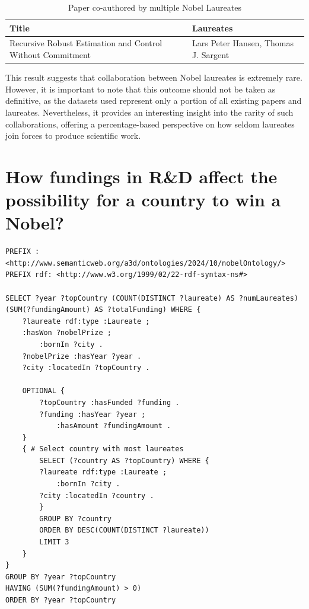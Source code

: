 \documentclass{article}
\begin{document}
\begin{table}[H]
	\caption{Paper co-authored by multiple Nobel Laureates}
	\centering
	\begin{tabular}{|l|l|}
		\hline
		\textbf{Title}                                             & \textbf{Laureates}                   \\ \hline
		Recursive Robust Estimation and Control Without Commitment & Lars Peter Hansen, Thomas J. Sargent \\ \hline
	\end{tabular}
	\label{tab:laureates_collaboration}
\end{table}

This result suggests that collaboration between Nobel laureates is extremely rare. However, it is important to
note that this outcome should not be taken as definitive, as the datasets used represent only a portion of all
existing papers and laureates. Nevertheless, it provides an interesting insight into the rarity of such
collaborations, offering a percentage-based perspective on how seldom laureates join forces to produce scientific
work.

\section{How fundings in R\&D affect the possibility for a country to win a Nobel?}

\begin{lstlisting}
PREFIX : <http://www.semanticweb.org/a3d/ontologies/2024/10/nobelOntology/>
PREFIX rdf: <http://www.w3.org/1999/02/22-rdf-syntax-ns#>

SELECT ?year ?topCountry (COUNT(DISTINCT ?laureate) AS ?numLaureates) (SUM(?fundingAmount) AS ?totalFunding) WHERE {
    ?laureate rdf:type :Laureate ;
  	:hasWon ?nobelPrize ;
        :bornIn ?city .
    ?nobelPrize :hasYear ?year .
    ?city :locatedIn ?topCountry .

    OPTIONAL {
        ?topCountry :hasFunded ?funding .
        ?funding :hasYear ?year ;
            :hasAmount ?fundingAmount .
    }
    { # Select country with most laureates
        SELECT (?country AS ?topCountry) WHERE {
        ?laureate rdf:type :Laureate ;
            :bornIn ?city .
        ?city :locatedIn ?country .
        }
        GROUP BY ?country
        ORDER BY DESC(COUNT(DISTINCT ?laureate))
        LIMIT 3
    }
}
GROUP BY ?year ?topCountry
HAVING (SUM(?fundingAmount) > 0)
ORDER BY ?year ?topCountry
\end{lstlisting}
\end{document}
